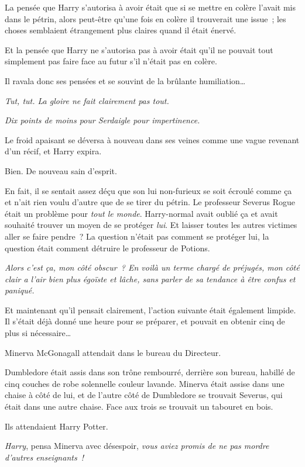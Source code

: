 La pensée que Harry s'autorisa à avoir était que si se mettre en colère l'avait mis dans le pétrin, alors peut-être qu'une fois en colère il trouverait une issue~; les choses semblaient étrangement plus claires quand il était énervé.

Et la pensée que Harry ne s'autorisa pas à avoir était qu'il ne pouvait tout simplement pas faire face au futur s'il n'était pas en colère.

Il ravala donc ses pensées et se souvint de la brûlante humiliation…

\emph{Tut, tut. La gloire ne fait clairement pas tout.}

\emph{Dix points de moins pour Serdaigle pour impertinence.}

Le froid apaisant se déversa à nouveau dans ses veines comme une vague revenant d'un récif, et Harry expira.

Bien. De nouveau sain d'esprit.

En fait, il se sentait assez déçu que son lui non-furieux se soit écroulé comme ça et n'ait rien voulu d'autre que de se tirer du pétrin. Le professeur Severus Rogue était un problème pour \emph{tout le monde}. Harry-normal avait oublié ça et avait souhaité trouver un moyen de se protéger \emph{lui}. Et laisser toutes les autres victimes aller se faire pendre~? La question n'était pas comment se protéger lui, la question était comment détruire le professeur de Potions.

\emph{Alors c'est ça, mon côté obscur~? En voilà un terme chargé de préjugés, mon côté clair a l'air bien plus égoïste et lâche, sans parler de sa tendance à être confus et paniqué.}

Et maintenant qu'il pensait clairement, l'action suivante était également limpide. Il s'était déjà donné une heure pour se préparer, et pouvait en obtenir cinq de plus si nécessaire…

\later

Minerva McGonagall attendait dans le bureau du Directeur.

Dumbledore était assis dans son trône rembourré, derrière son bureau, habillé de cinq couches de robe solennelle couleur lavande. Minerva était assise dans une chaise à côté de lui, et de l'autre côté de Dumbledore se trouvait Severus, qui était dans une autre chaise. Face aux trois se trouvait un tabouret en bois.

Ils attendaient Harry Potter.

\emph{Harry}, pensa Minerva avec désespoir, \emph{vous aviez promis de ne pas mordre d'autres enseignants~!}


